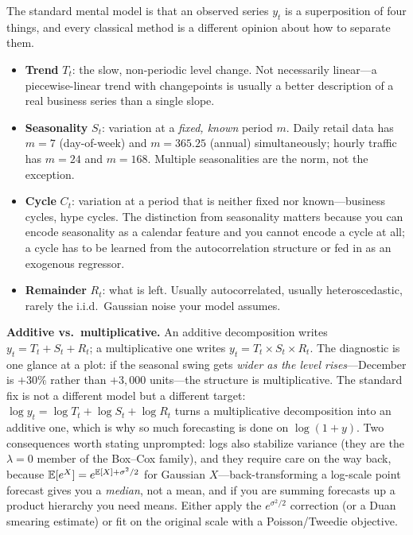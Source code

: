 The standard mental model is that an observed series $y_t$ is a superposition of four things, and every classical method is a different opinion about how to separate them.

\begin{itemize}
    \item \textbf{Trend} $T_t$: the slow, non-periodic level change. Not necessarily linear---a piecewise-linear trend with changepoints is usually a better description of a real business series than a single slope.
    \item \textbf{Seasonality} $S_t$: variation at a \emph{fixed, known} period $m$. Daily retail data has $m=7$ (day-of-week) and $m=365.25$ (annual) simultaneously; hourly traffic has $m=24$ and $m=168$. Multiple seasonalities are the norm, not the exception.
    \item \textbf{Cycle} $C_t$: variation at a period that is neither fixed nor known---business cycles, hype cycles. The distinction from seasonality matters because you can encode seasonality as a calendar feature and you cannot encode a cycle at all; a cycle has to be learned from the autocorrelation structure or fed in as an exogenous regressor.
    \item \textbf{Remainder} $R_t$: what is left. Usually autocorrelated, usually heteroscedastic, rarely the i.i.d.\ Gaussian noise your model assumes.
\end{itemize}

\textbf{Additive vs.\ multiplicative.} An additive decomposition writes $y_t = T_t + S_t + R_t$; a multiplicative one writes $y_t = T_t \times S_t \times R_t$. The diagnostic is one glance at a plot: if the seasonal swing gets \emph{wider as the level rises}---December is $+30\%$ rather than $+3{,}000$ units---the structure is multiplicative. The standard fix is not a different model but a different target: $\log y_t = \log T_t + \log S_t + \log R_t$ turns a multiplicative decomposition into an additive one, which is why so much forecasting is done on $\log(1+y)$. Two consequences worth stating unprompted: logs also stabilize variance (they are the $\lambda=0$ member of the Box--Cox family), and they require care on the way back, because $\operatorname{\mathbb{E}}[e^X] = e^{\operatorname{\mathbb{E}}[X] + \sigma^2/2}$ for Gaussian $X$---back-transforming a log-scale point forecast gives you a \emph{median}, not a mean, and if you are summing forecasts up a product hierarchy you need means. Either apply the $e^{\sigma^2/2}$ correction (or a Duan smearing estimate) or fit on the original scale with a Poisson/Tweedie objective.

